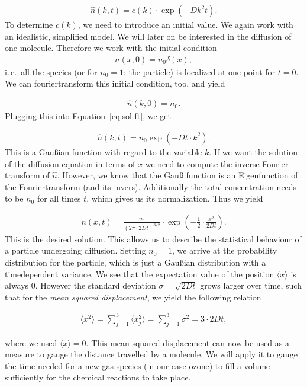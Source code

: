 \begin{align}
  \hat n(k,t) = c(k) \cdot \exp(-Dk^2 t). \label{eq:sol-ft}
\end{align}
To determine $c(k)$, we need to introduce an initial value. We again
work with an idealistic, simplified model. We will later on be
interested in the diffusion of one molecule. Therefore we work with
the initial condition
\begin{align*}
  n(x,0) = n_0 \delta(x),
\end{align*}
i.\,e.\ all the species (or for $n_0 = 1$: the particle) is localized
at one point for $t = 0$. We can fouriertransform this initial
condition, too, and yield

\begin{align*}
  \hat n(k,0) = n_0.
\end{align*}
Plugging this into Equation~\eqref{eq:sol-ft}, we get

\begin{align*}
  \hat n(k,t) = n_0 \exp(-Dt \cdot k^2).
\end{align*}
This is a Gaußian function with regard to the variable $k$. If we want
the solution of the diffusion equation in terms of $x$ we need to
compute the inverse Fourier transform of $\hat n$. However, we know
that the Gauß function is an Eigenfunction of the Fouriertransform
(and its invers). Additionally the total concentration needs to be $n_0$
for all times $t$, which gives us its normalization. Thus we yield

\begin{align*}
  n(x,t) = \frac{n_0}{(2\pi \cdot 2Dt)^{3/2}} \cdot \exp \left(
  -\frac{1}{2} \cdot \frac{x^2}{2Dt} \right).
\end{align*}
This is the desired solution. This allows us to describe the statistical
behaviour of a particle undergoing diffusion. Setting $n_0 = 1$, we
arrive at the probability distribution for the particle, which is just
a Gaußian distribution with a timedependent variance. We see that the
expectation value of the position $\langle x \rangle$ is always
0. However the standard deviation $\sigma = \sqrt{2Dt}$ grows larger
over time, such that for the \emph{mean squared displacement}, we
yield the following relation

\begin{align}
  \langle x^2 \rangle = \sum_{j=1}^3 \langle
  x_j^2 \rangle = \sum_{j=1}^3 \sigma^2 = 3 \cdot 2Dt, \label{eq:mqd}
\end{align}

where we used $\langle x \rangle = 0$. This mean squared displacement
can now be used as a measure to gauge the distance travelled by a
molecule. We will apply it to gauge the time needed for a new gas
species (in our case ozone) to fill a volume sufficiently for the
chemical reactions to take place.

